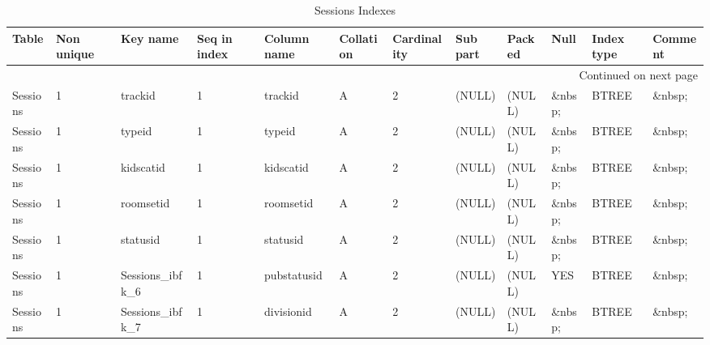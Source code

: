 \documentclass[tablesignature]{scrartcl}
\begin{document}
\begin{longtable}{|l|l|l|l|l|l|l|l|l|l|l|l|}
\caption{Sessions Indexes} \label{tbl:sessionsindexes}\\
\hline
 Table     &  Non unique  &  Key name               &  Seq in index  &  Column name  &  Collation  &  Cardinality  &  Sub part  &  Packed  &  Null     &  Index type  &  Comment \\
\hline
\endhead
\hline\multicolumn{12}{r}{Continued on next page}\
\endfoot
\endlastfoot
\hline
 Sessions  &           0  &  PRIMARY                &             1  &  sessionid    &  A          &            2  &  (NULL)    &  (NULL)  &  \&nbsp;  &  BTREE       &  \&nbsp;  \\
 Sessions  &           1  &  trackid                &             1  &  trackid      &  A          &            2  &  (NULL)    &  (NULL)  &  \&nbsp;  &  BTREE       &  \&nbsp;  \\
 Sessions  &           1  &  typeid                 &             1  &  typeid       &  A          &            2  &  (NULL)    &  (NULL)  &  \&nbsp;  &  BTREE       &  \&nbsp;  \\
 Sessions  &           1  &  kidscatid              &             1  &  kidscatid    &  A          &            2  &  (NULL)    &  (NULL)  &  \&nbsp;  &  BTREE       &  \&nbsp;  \\
 Sessions  &           1  &  roomsetid              &             1  &  roomsetid    &  A          &            2  &  (NULL)    &  (NULL)  &  \&nbsp;  &  BTREE       &  \&nbsp;  \\
 Sessions  &           1  &  statusid               &             1  &  statusid     &  A          &            2  &  (NULL)    &  (NULL)  &  \&nbsp;  &  BTREE       &  \&nbsp;  \\
 Sessions  &           1  &  Sessions\_{}ibfk\_{}6  &             1  &  pubstatusid  &  A          &            2  &  (NULL)    &  (NULL)  &  YES      &  BTREE       &  \&nbsp;  \\
 Sessions  &           1  &  Sessions\_{}ibfk\_{}7  &             1  &  divisionid   &  A          &            2  &  (NULL)    &  (NULL)  &  \&nbsp;  &  BTREE       &  \&nbsp;  \\
\hline
\end{longtable}
\end{document}

